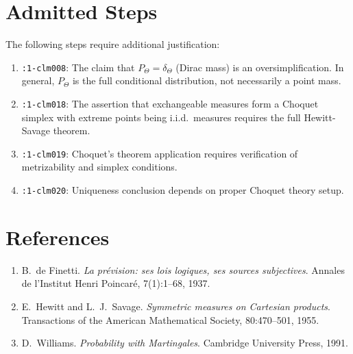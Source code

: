 \documentclass[11pt,a4paper]{article}
\theoremstyle{definition}
\theoremstyle{plain}
\begin{document}
\section{Admitted Steps}

The following steps require additional justification:

\begin{enumerate}
\item \texttt{:1-clm008}: The claim that $P_\Theta = \delta_\Theta$ (Dirac mass) is an oversimplification. In general, $P_\Theta$ is the full conditional distribution, not necessarily a point mass.

\item \texttt{:1-clm018}: The assertion that exchangeable measures form a Choquet simplex with extreme points being i.i.d.\ measures requires the full Hewitt-Savage theorem.

\item \texttt{:1-clm019}: Choquet's theorem application requires verification of metrizability and simplex conditions.

\item \texttt{:1-clm020}: Uniqueness conclusion depends on proper Choquet theory setup.
\end{enumerate}

\section{References}

\begin{enumerate}
\item B.~de Finetti. \textit{La pr\'evision: ses lois logiques, ses sources subjectives}. Annales de l'Institut Henri Poincar\'e, 7(1):1--68, 1937.

\item E.~Hewitt and L.~J.~Savage. \textit{Symmetric measures on Cartesian products}. Transactions of the American Mathematical Society, 80:470--501, 1955.

\item D.~Williams. \textit{Probability with Martingales}. Cambridge University Press, 1991.
\end{enumerate}
\end{document}
